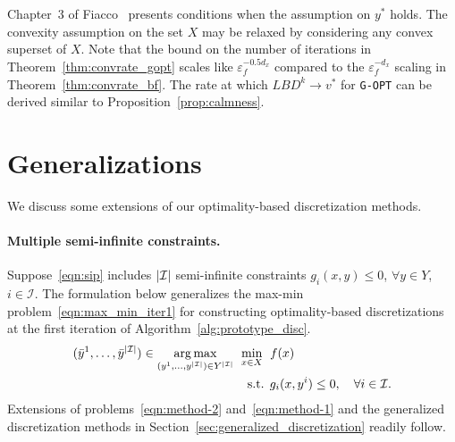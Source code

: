 \documentclass{article}
\DeclareMathOperator*{\argmax}{arg\,max}
\DeclarePairedDelimiter\abs{\lvert}{\rvert}%
\newcommand{\1}[1]{\mathds{1}\left[#1\right]}
\begin{document}
Chapter~3 of Fiacco~\cite{fiacco1983} presents conditions when the assumption on $y^*$ holds.
The convexity assumption on the set $X$ may be relaxed by considering any convex superset of $X$.
Note that the bound on the number of iterations in Theorem~\ref{thm:convrate_gopt} scales like $\varepsilon_f^{-0.5d_x}$ compared to the $\varepsilon_f^{-d_x}$ scaling in Theorem~\ref{thm:convrate_bf}.
The rate at which $LBD^k \to v^*$ for \texttt{G-OPT} can be derived similar to Proposition~\ref{prop:calmness}.





\section{Generalizations}
\label{sec:generalizations}


We discuss some extensions of our optimality-based discretization methods.


\paragraph*{Multiple semi-infinite constraints.}
Suppose~\eqref{eqn:sip} includes $\abs{\mathcal{I}}$ semi-infinite constraints $g_i(x,y) \leq 0$, $\forall y \in Y$, $i \in \mathcal{I}$.
The formulation below generalizes the max-min problem~\eqref{eqn:max_min_iter1} for constructing optimality-based discretizations at the first iteration of Algorithm~\ref{alg:prototype_disc}.
\begin{align*}
(\bar{y}^1, \dots, \bar{y}^{\abs{\mathcal{I}}}) \in \argmax_{(y^1, \dots,y^{\abs{\mathcal{I}}}) \in Y^{\abs{\mathcal{I}}}} \:\: & \min_{x \in X} \:\: f(x) \\
& \:\:\:\text{s.t.} \:\: g_i(x,y^i) \leq 0, \quad \forall i \in \mathcal{I}. \nonumber
\end{align*}
Extensions of problems~\eqref{eqn:method-2} and~\eqref{eqn:method-1} and the generalized discretization methods in Section~\ref{sec:generalized_discretization} readily follow.
\end{document}
